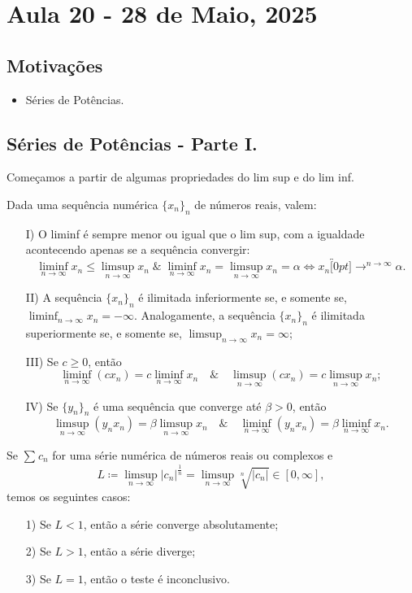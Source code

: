 \documentclass[../analysisII_notes.tex]{subfiles}
\begin{document}
\section{Aula 20 - 28 de Maio, 2025}
\subsection{Motivações}
\begin{itemize}
	\item Séries de Potências.
\end{itemize}
\subsection{Séries de Potências - Parte I.}
Começamos a partir de algumas propriedades do lim sup e do lim inf.
\begin{prop*}
	Dada uma sequência numérica \(\{x_{n}\}_{n}\) de números reais, valem:
	\begin{itemize}
		\item[I)] O liminf é sempre menor ou igual que o lim sup, com a igualdade acontecendo apenas se a sequência convergir:
		      \[
			      \liminf_{n\to \infty}x_{n}\leq \limsup_{n\to \infty}x_{n}\;\&\; \liminf_{n\to \infty}x_{n}=\limsup_{n\to \infty}x_{n}=\alpha \Longleftrightarrow x_{n}\overbracket[0pt]{\longrightarrow}^{n\to \infty}\alpha .
		      \]
		\item[II)] A sequência \(\{x_{n}\}_{n}\) é ilimitada inferiormente se, e somente se, \(\liminf_{n\to \infty}x_{n} = -\infty\). Analogamente, a sequência \(\{x_{n}\}_{n}\) é ilimitada superiormente se, e somente se, \(\limsup_{n\to \infty}x_{n} = \infty\);
		\item[III)] Se \(c \geq 0\), então
		      \[
			      \liminf_{n\to \infty}(cx_{n}) = c \liminf_{n\to \infty}x_{n} \quad\&\quad \limsup_{n\to \infty}(cx_{n}) = c \limsup_{n\to \infty}x_{n};
		      \]
		\item[IV)] Se \(\{y_{n}\}_{n}\) é uma sequência que converge até \(\beta > 0\), então
		      \[
			      \limsup_{n\to \infty}(y_{n}x_{n}) = \beta \limsup_{n\to \infty}x_{n} \quad\&\quad \liminf_{n\to \infty}(y_{n}x_{n}) = \beta \liminf_{n\to \infty}x_{n}.
		      \]
	\end{itemize}
\end{prop*}
\hypertarget{root_test}{
	\begin{theorem*}
		Se \(\sum\limits_{}^{}c_{n}\) for uma série numérica de números reais ou complexos e
		\[
			L\coloneqq \limsup_{n\to \infty}|c_{n}|^{\frac{1}{n}} = \limsup_{n\to \infty}\sqrt[n]{|c_{n}|}\in [0, \infty],
		\]
		temos os seguintes casos:
		\begin{itemize}
			\item[1)] Se \(L < 1\), então a série converge absolutamente;
			\item[2)] Se \(L > 1\), então a série diverge;
			\item[3)] Se \(L = 1\), então o teste é inconclusivo.
		\end{itemize}
	\end{theorem*}
}
\end{document}
